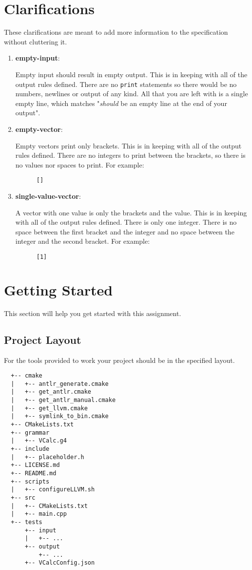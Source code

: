 \documentclass{article}
\newcommand{\code}[1]{\texttt{\textmd{#1}}}
\newcommand{\clarificationdest}[1]{\hypertarget{#1}{\textbf{#1}:}}
\begin{document}
\section{Clarifications}
These clarifications are meant to add more information to the specification without cluttering it.
\begin{enumerate}
  \item
    \clarificationdest{empty-input}
    Empty input should result in empty output. This is in keeping with all of the output rules
    defined. There are no \code{print} statements so there would be no numbers, newlines or output
    of any kind. All that you are left with is a single empty line, which matches "\textit{should}
    be an empty line at the end of your output".
  \item
    \clarificationdest{empty-vector}
    Empty vectors print only brackets. This is in keeping with all of the output rules defined.
    There are no integers to print between the brackets, so there is no values nor spaces to print.
    For example:
    \begin{lstlisting}
      []
    \end{lstlisting}
  \item
    \clarificationdest{single-value-vector}
    A vector with one value is only the brackets and the value. This is in keeping with all of the
    output rules defined. There is only one integer. There is no space between the first bracket
    and the integer and no space between the integer and the second bracket. For example:
    \begin{lstlisting}
      [1]
    \end{lstlisting}
\end{enumerate}

\section{Getting Started}
This section will help you get started with this assignment.

\subsection{Project Layout}
For the tools provided to work your project should be in the specified layout.
\begin{lstlisting}
  +-- cmake
  |   +-- antlr_generate.cmake
  |   +-- get_antlr.cmake
  |   +-- get_antlr_manual.cmake
  |   +-- get_llvm.cmake
  |   +-- symlink_to_bin.cmake
  +-- CMakeLists.txt
  +-- grammar
  |   +-- VCalc.g4
  +-- include
  |   +-- placeholder.h
  +-- LICENSE.md
  +-- README.md
  +-- scripts
  |   +-- configureLLVM.sh
  +-- src
  |   +-- CMakeLists.txt
  |   +-- main.cpp
  +-- tests
      +-- input
      |   +-- ...
      +-- output
          +-- ...
      +-- VCalcConfig.json
\end{lstlisting}
\end{document}
